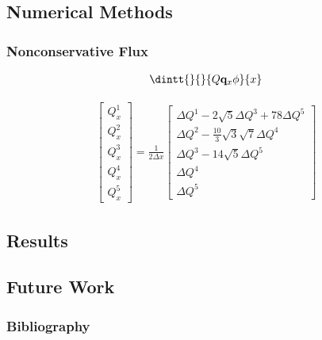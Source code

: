 \documentclass[10pt]{beamer}
\begin{document}
    \subsection{Numerical Methods}
      \begin{frame}
        \frametitle{Nonconservative Flux}

        \begin{gather*}
          \dintt{}{}{Q \v{q}_x \phi}{x}
        \end{gather*}

        \begin{gather*}
          \begin{bmatrix}
            Q_x^1 \\
            Q_x^2 \\
            Q_x^3 \\
            Q_x^4 \\
            Q_x^5
          \end{bmatrix}
          = \frac{1}{2\Delta x}
          \begin{bmatrix}
            \Delta Q^1 - 2\sqrt{5} \Delta Q^3 + 78 \Delta Q^5 \\
            \Delta Q^2 - \frac{10}{3} \sqrt{3} \sqrt{7} \Delta Q^4 \\
            \Delta Q^3 - 14 \sqrt{5} \Delta Q^5 \\
            \Delta Q^4 \\
            \Delta Q^5
          \end{bmatrix}
        \end{gather*}

      \end{frame}

    \subsection{Results}
      

    \subsection{Future Work}

    \begin{frame}[allowframebreaks]
      \frametitle{Bibliography}
      \nocite{*}
      \printbibliography{}
    \end{frame}
\end{document}
